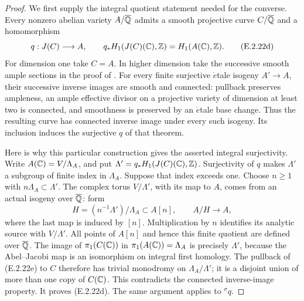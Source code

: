 \begin{proof}
We first supply the integral quotient statement needed for the
converse. Every nonzero abelian variety \(A/\overline{\mathbb Q}\) admits a
smooth projective curve \(C/\overline{\mathbb Q}\) and a homomorphism
\[
 q:J(C)\longrightarrow A,\qquad
 q_*H_1(J(C)(\mathbb C),\mathbb Z)=H_1(A(\mathbb C),\mathbb Z).
 \tag{E.2.22d}
\]
For dimension one take \(C=A\). In higher dimension take the
successive smooth ample sections in the proof of
\cite[Theorem 10.1, Lemma 10.3, pp.33--35]{GenMilneJVs2021}.
For every finite surjective \(\acute{e}\)tale isogeny
\(A'\to A\), their successive inverse images are smooth and
connected: pullback preserves ampleness, an ample effective
divisor on a projective variety of dimension at least two is
connected, and smoothness is preserved by an \(\acute{e}\)tale
base change. Thus the resulting curve has connected inverse
image under every such isogeny. Its inclusion induces the
surjective \(q\) of that theorem.

Here is why this particular construction gives the asserted
integral surjectivity. Write
\(A(\mathbb C)=V/\Lambda_A\), and put
\(\Lambda'=q_*H_1(J(C)(\mathbb C),\mathbb Z)\).
Surjectivity of \(q\) makes \(\Lambda'\) a subgroup of finite
index in \(\Lambda_A\). Suppose that index exceeds one.
Choose \(n\geq1\) with \(n\Lambda_A\subset\Lambda'\).
The complex torus \(V/\Lambda'\), with its map to \(A\),
comes from an actual isogeny over \(\overline{\mathbb Q}\): form
\[
 H=(n^{-1}\Lambda')/\Lambda_A\subset A[n],
 \qquad A/H\longrightarrow A,
 \tag{E.2.22e}
\]
where the last map is induced by \([n]\).
Multiplication by \(n\) identifies its analytic source with
\(V/\Lambda'\). All points of \(A[n]\) and hence this finite
quotient are defined over \(\overline{\mathbb Q}\).
The image of \(\pi_1(C(\mathbb C))\) in
\(\pi_1(A(\mathbb C))=\Lambda_A\) is precisely \(\Lambda'\),
because the Abel--Jacobi map is an isomorphism on integral
first homology. The pullback of (E.2.22e) to \(C\) therefore
has trivial monodromy on \(\Lambda_A/\Lambda'\); it is a
disjoint union of more than one copy of \(C(\mathbb C)\).
This contradicts the connected inverse-image property.
It proves (E.2.22d). The same argument applies to
\({}^{\sigma}q\).


\end{proof}
